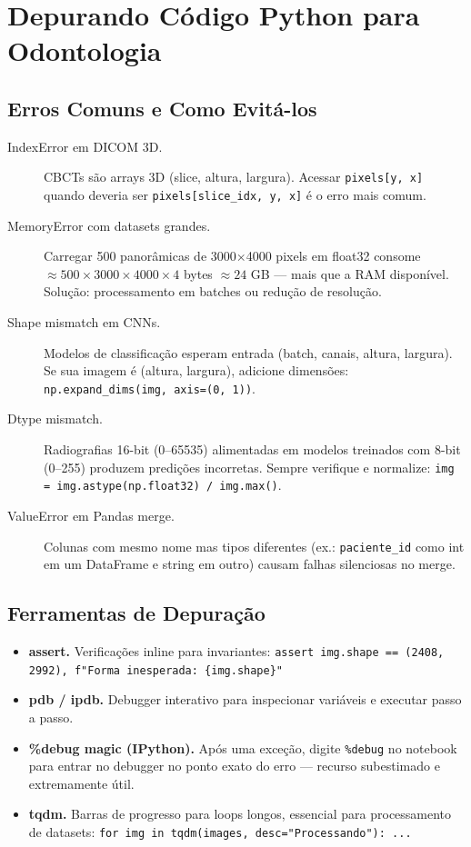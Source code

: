 \section{Depurando Código Python para Odontologia}

\subsection{Erros Comuns e Como Evitá-los}

\begin{description}
    \item[IndexError em DICOM 3D.] CBCTs são arrays 3D (slice, altura, largura). Acessar \texttt{pixels[y, x]} quando deveria ser \texttt{pixels[slice\_idx, y, x]} é o erro mais comum.
    \item[MemoryError com datasets grandes.] Carregar 500 panorâmicas de 3000$\times$4000 pixels em float32 consome $\approx 500 \times 3000 \times 4000 \times 4$ bytes $\approx 24$ GB — mais que a RAM disponível. Solução: processamento em batches ou redução de resolução.
    \item[Shape mismatch em CNNs.] Modelos de classificação esperam entrada (batch, canais, altura, largura). Se sua imagem é (altura, largura), adicione dimensões: \texttt{np.expand\_dims(img, axis=(0, 1))}.
    \item[Dtype mismatch.] Radiografias 16-bit (0--65535) alimentadas em modelos treinados com 8-bit (0--255) produzem predições incorretas. Sempre verifique e normalize: \texttt{img = img.astype(np.float32) / img.max()}.
    \item[ValueError em Pandas merge.] Colunas com mesmo nome mas tipos diferentes (ex.: \texttt{paciente\_id} como int em um DataFrame e string em outro) causam falhas silenciosas no merge.
\end{description}

\subsection{Ferramentas de Depuração}

\begin{itemize}
    \item \textbf{assert.} Verificações inline para invariantes: \texttt{assert img.shape == (2408, 2992), f"Forma inesperada: \{img.shape\}"}
    \item \textbf{pdb / ipdb.} Debugger interativo para inspecionar variáveis e executar passo a passo.
    \item \textbf{\%debug magic (IPython).} Após uma exceção, digite \texttt{\%debug} no notebook para entrar no debugger no ponto exato do erro — recurso subestimado e extremamente útil.
    \item \textbf{tqdm.} Barras de progresso para loops longos, essencial para processamento de datasets: \texttt{for img in tqdm(images, desc="Processando"): ...}
\end{itemize}

